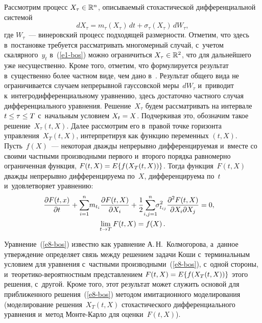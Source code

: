 \begin{multicols}{2}
     Рассмотрим процесс $X_\tau\hm\in \mathbb{R}^n$, опи\-сы\-ва\-емый 
стохастической дифференциальной системой 
$$
dX_\tau= m_\tau \left(X_\tau\right)\,dt 
+ \sigma_\tau\left(X_\tau\right)\,dW_\tau,
$$
 где $W_\tau$~--- винеровский процесс 
подходящей размерности. Отметим, что здесь в~постановке требуется 
рассматривать многомерный случай, с~учетом скалярного~$y_t$  
в~(\ref{e1-bos}) можно ограничиться $X_\tau\hm\in \mathbb{R}^2$, что для 
дальнейшего уже несущественно. Кроме того, отметим, что формулируется 
результат в~существенно более частном виде, чем дано в~\cite{3-bos}. 
Результат общего вида не ограничивается случаем непрерывной гауссовской 
меры~$dW_\tau$ и~приводит к~интегродифференциальному уравнению, 
здесь достаточно частного случая дифференциального уравнения. 
Решение~$X_\tau$ будем рассматривать на интервале $t\hm\leq \tau\hm\leq T$ 
с~начальным условием $X_t\hm=X$. Подчеркивая это, обозначим такое 
решение~$X_\tau(t,X)$. Далее рассмотрим его в~правой точке горизонта 
управления~$X_T(t,X)$, интерпретируя как функцию переменных $(t,X)$. 
Пусть~$f(X)$~--- некоторая дважды непрерывно дифференцируемая и~вместе 
со своими частными производными первого и~второго порядка равномерно 
ограниченная функция, $F(t,X)\hm= E\{ f(X_T(t,X))\}$. Тогда 
функция~$F(t,X)$ дважды непрерывно дифференцируема по~$X$, 
дифференцируема по~$t$ и~удовлетворяет уравнению:
     \begin{multline}
\hspace*{-10pt}\fr{\partial F(t,x)}{\partial t}+\sum\limits_{i=1}^n \hspace*{-2pt}m_{t_i} 
\fr{\partial 
F(t,X)}{\partial X_i} +\fr{1}{2}\!\sum\limits^n_{i,j=1} \hspace*{-4pt}\sigma^2_{t_{ij}} \fr{ 
\partial^2 F(t,X)}{\partial X_i\partial X_j}=0,\\
     \lim\limits_{t\to T} F(t,X) =f(X)\,.
     \label{e8-bos}
     \end{multline} 
     
     Уравнение~(\ref{e8-bos}) известно как уравнение А.\,Н.~Колмогорова, 
а~данное утверждение определяет связь между решением задачи Коши 
с~терминальным условием для уравнения с~частными 
производными~(\ref{e8-bos}), с~одной стороны,  
и~тео\-ре\-ти\-ко-ве\-ро\-ят\-ност\-ным пред\-став\-ле\-ни\-ем $F(t,X)\hm= E\{ 
f(X_T(t,X))\}$ этого решения, с~другой. Кроме того, этот результат может 
служить основой для приближенного решения~(\ref{e8-bos}) методом 
имитационного моделирования (моделирование решения~$X_T(t,X)$ 
стохастического дифференциального уравнения и~метод Мон\-те-Кар\-ло для 
оценки~$F(t,X)$).
     

\end{multicols}

